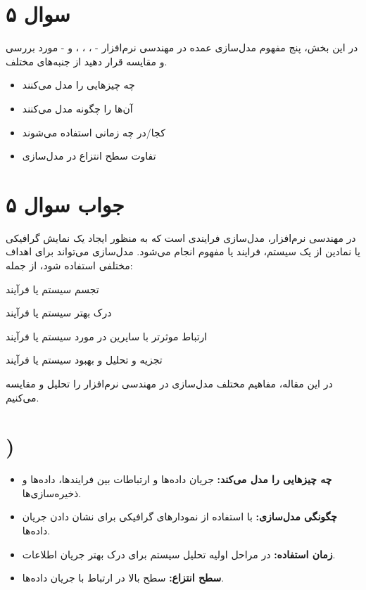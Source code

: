 \section*{سوال ۵}

در این بخش، پنج مفهوم مدل‌سازی عمده در مهندسی نرم‌افزار -
،
،
،
و
- مورد بررسی و مقایسه قرار دهید از جنبه‌های مختلف.

\begin{itemize}
	\item چه چیزهایی را مدل می‌کنند
	\item آن‌ها را چگونه مدل می‌کنند
	\item کجا/در چه زمانی استفاده می‌شوند
	\item تفاوت سطح انتزاع در مدل‌سازی
\end{itemize}

\section*{جواب سوال ۵}

در مهندسی نرم‌افزار، مدل‌سازی فرایندی است که به منظور ایجاد یک نمایش گرافیکی یا نمادین از یک سیستم، فرایند یا مفهوم انجام می‌شود. مدل‌سازی می‌تواند برای اهداف مختلفی استفاده شود، از جمله:

تجسم سیستم یا فرآیند

درک بهتر سیستم یا فرآیند

ارتباط موثرتر با سایرین در مورد سیستم یا فرآیند

تجزیه و تحلیل و بهبود سیستم یا فرآیند

در این مقاله، مفاهیم مختلف مدل‌سازی در مهندسی نرم‌افزار را تحلیل و مقایسه می‌کنیم.

\section*{)}
\begin{itemize}
	\item \textbf{چه چیزهایی را مدل می‌کند:} جریان داده‌ها و ارتباطات بین فرایندها، داده‌ها و ذخیره‌سازی‌ها.
	\item \textbf{چگونگی مدل‌سازی:} با استفاده از نمودارهای گرافیکی برای نشان دادن جریان داده‌ها.
	\item \textbf{زمان استفاده:} در مراحل اولیه تحلیل سیستم برای درک بهتر جریان اطلاعات.
	\item \textbf{سطح انتزاع:} سطح بالا در ارتباط با جریان داده‌ها.
\end{itemize}

